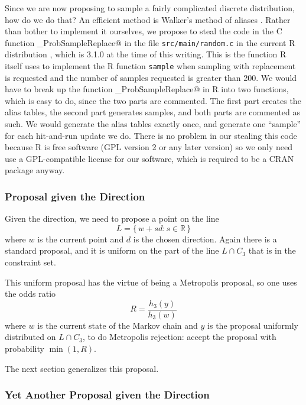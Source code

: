 \documentclass[11pt]{article}
\newcommand{\real}{\mathbb{R}}
\newcommand{\set}[1]{\{\, #1 \,\}}
\begin{document}
Since we are now proposing to sample a fairly complicated discrete
distribution, how do we do that?  An efficient method is Walker's method
of aliases \citep{walker}.  Rather than bother to implement it ourselves,
we propose to steal the code
in the C function \verb@walker_ProbSampleReplace@ in the file
\texttt{src/main/random.c} in the current R distribution \citep{r},
which is 3.1.0 at the time of this writing.  This is the function R
itself uses to implement the R function \texttt{sample} when sampling
with replacement is requested and the number of samples requested
is greater than 200.  We would have to break up the function
\verb@walker_ProbSampleReplace@ in R into two functions, which is
easy to do, since the two parts are commented.  The first part creates
the alias tables, the second part generates samples, and both parts
are commented as such.  We would generate the alias tables exactly once,
and generate one ``sample'' for each hit-and-run update we do.
There is no problem in our stealing this code because R is free software
(GPL version 2 or any later version) so we only need use a GPL-compatible
license for our software, which is required to be a CRAN package anyway.

\subsubsection{Proposal given the Direction} \label{sec:proposal-uniform}

Given the direction, we need to propose a point on the line
\begin{equation} \label{eq:line}
   L = \set{ w + s d : s \in \real }
\end{equation}
where $w$ is the current point and $d$ is the chosen direction.  Again
there is a standard proposal, and it is uniform on the part of the line
$L \cap C_3$ that is in the constraint set.

This uniform proposal has the virtue of being a Metropolis proposal,
so one uses the odds ratio
\begin{equation} \label{eq:metropolis-ratio}
   R = \frac{h_3(y)}{h_3(w)}
\end{equation}
where $w$ is the current state of the Markov chain and $y$ is the proposal
uniformly distributed on $L \cap C_3$, to do Metropolis rejection: accept
the proposal with probability $\min(1, R)$.

The next section generalizes this proposal.

\subsubsection{Yet Another Proposal given the Direction}
\end{document}
